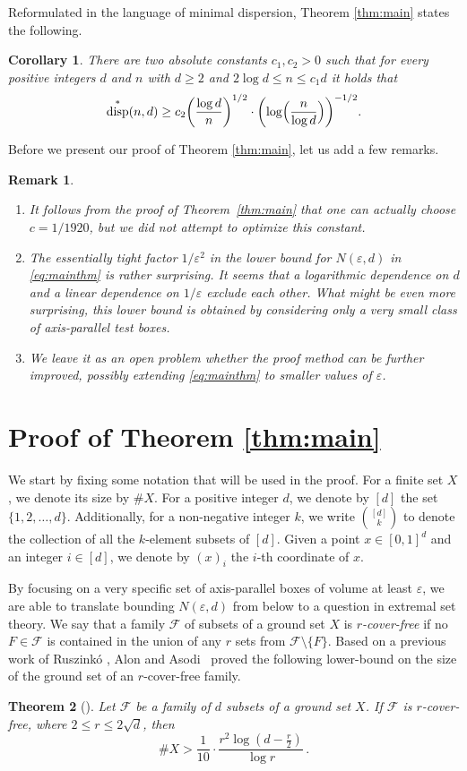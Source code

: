 \documentclass[11pt]{article}
\newtheorem{theorem}{Theorem}
\newtheorem{cor}[theorem]{Corollary}
\newtheorem*{rem}{Remark}
\newcommand{\eps}{\varepsilon}
\newcommand{\cF}{\mathcal{F}}
\DeclareMathOperator\disp{disp}
\def\const{1920}
\begin{document}
Reformulated in the language of minimal dispersion, Theorem \ref{thm:main} states the following.
\begin{cor}There are two absolute constants $c_1,c_2>0$ such that for every positive integers $d$ and $n$ with $d\ge 2$ and $2\log d\le n\le c_1 d$ it holds that
\[
\disp^*(n,d)\ge c_2 \biggl(\frac{\log d}{n}\biggr)^{1/2}\cdot \biggl(\log\Bigl(\frac{n}{\log d}\Bigr)\biggr)^{-1/2}.
\]
\end{cor}

Before we present our proof of Theorem \ref{thm:main}, let us add a few remarks.
\begin{rem}
\begin{enumerate}
\item It follows from the proof of Theorem~\ref{thm:main} that one can actually choose $c=1/\const$, but we did not attempt to optimize this constant.
\item The essentially tight factor $1/\eps^2$ in the lower bound for $N(\varepsilon,d)$ in \eqref{eq:mainthm} is rather surprising.
It seems that a logarithmic dependence on $d$ and a linear dependence on $1/\varepsilon$ exclude each other.
What might be even more surprising, this lower bound is obtained by considering only a very small class of axis-parallel test boxes.
\item We leave it as an open problem whether the proof method can be further improved, possibly extending \eqref{eq:mainthm} to smaller values of $\varepsilon$.
\end{enumerate}
\end{rem}

\section{Proof of Theorem \ref{thm:main}}\label{sec:proof}

We start by fixing some notation that will be used in the proof.
For a finite set $X$, we denote its size by $\# X$.
For a positive integer $d$, we denote by $[d]$ the set $\{1,2,\ldots,d\}$.
Additionally, for a non-negative integer $k$, we write $\binom{[d]}k$ to denote the collection of all the $k$-element subsets of $[d]$.
%
Given a point $x \in [0,1]^d$ and an integer $i \in [d]$, we denote by $(x)_i$ the $i$-th coordinate of $x$.

By focusing on a very specific set of axis-parallel boxes of volume at least $\eps$, we are able to translate bounding $N(\eps,d)$ from below to a question in extremal set theory.
%
We say that a family $\cF$ of subsets of a ground set $X$ is \emph{$r$-cover-free} if no $F \in \cF$ is contained in the union of any $r$ sets from $\cF \setminus \{F\}$.
Based on a previous work of Ruszink\'o \cite{Rusz}, Alon and Asodi~\cite{AA} proved the following lower-bound on the size of the ground set of an $r$-cover-free family.
\begin{theorem}[{\cite[Lemma 2.8]{AA}}]
\label{thm:AlonAsodi}
Let $\cF$ be a family of $d$ subsets of a ground set $X$.
If $\cF$ is $r$-cover-free, where $2 \le r \le 2\sqrt{d}$, then \[
\# X > \frac1{10}\cdot \frac{r^2 \log\left(d-\frac r2\right)}{\log r}
\,.\]
\end{theorem}
\end{document}
